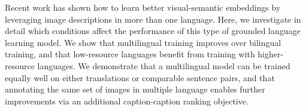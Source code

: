Recent work has shown how to learn better visual-semantic embeddings by leveraging image descriptions in more than one language. Here, we investigate in detail which conditions affect the performance of this type of grounded language learning model. We show that multilingual training improves over bilingual training, and that low-resource languages benefit from training with higher-resource languages. We demonstrate that a multilingual model can be trained equally well on either translations or comparable sentence pairs, and that annotating the same set of images in multiple language enables further improvements via an additional caption-caption ranking objective.
